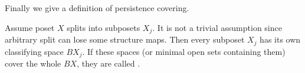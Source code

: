 Finally we give a definition of persistence covering.\\

\begin{definition}
  Assume poset $X$ splits into subposets $X_j$. It is not a trivial assumption since arbitrary split can lose some structure maps. Then every subposet $X_j$ has its own classifying space $BX_j$. If these spaces (or minimal open sets containing them) cover the whole $BX$, they are called .
\end{definition}
